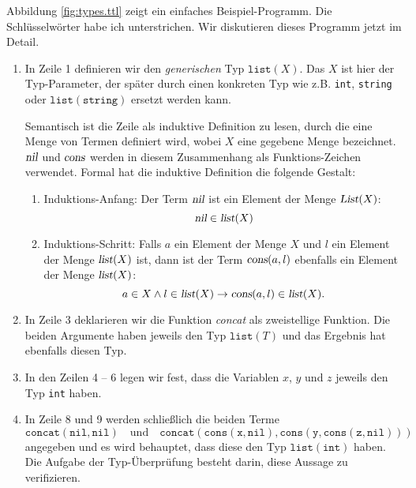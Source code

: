 Abbildung \ref{fig:types.ttl} zeigt ein einfaches Beispiel-Programm.  Die Schl\"usselw\"orter habe ich
unterstrichen.  Wir diskutieren dieses Programm jetzt im Detail.
\begin{enumerate}
\item In Zeile 1 definieren wir den \emph{generischen} Typ $\texttt{list}(X)$.  Das $X$ ist hier der
      Typ-Parameter, der sp\"ater durch einen konkreten Typ wie z.B. \texttt{int},
      \texttt{string} oder $\mathtt{list}(\mathtt{string})$ ersetzt werden kann.

      Semantisch ist die Zeile als induktive Definition zu lesen, durch die eine Menge von Termen
      definiert wird, wobei $X$ eine gegebene Menge bezeichnet. 
      $\textsl{nil}$ und $\textsl{cons}$ werden in diesem Zusammenhang als Funktions-Zeichen verwendet.
      Formal hat die induktive Definition die folgende Gestalt:
      \begin{enumerate}
      \item Induktions-Anfang:  Der Term $\textsl{nil}$ ist ein Element der Menge $\textsl{List}(X)$:
            \[ \textsl{nil} \in \textsl{list}(X) \]
      \item Induktions-Schritt:  Falls $a$ ein Element der Menge $X$ und $l$ ein Element der
            Menge $\textsl{list}(X)$ ist, dann ist der Term $\textsl{cons}(a,l)$ ebenfalls
            ein Element der Menge $\textsl{list}(X)$:
            \[ a \in X \wedge l \in \textsl{list}(X) \rightarrow \textsl{cons}(a,l) \in \textsl{list}(X). \]
      \end{enumerate}
\item In Zeile 3 deklarieren wir die Funktion \textsl{concat} als zweistellige Funktion.  Die
      beiden Argumente haben jeweils den Typ $\texttt{list}(T)$ und das Ergebnis hat ebenfalls
      diesen Typ.
\item In den Zeilen 4 -- 6 legen wir fest, dass die Variablen $x$, $y$ und $z$ jeweils den Typ
      \texttt{int} haben.
\item In Zeile 8 und 9 werden schlie{\ss}lich die beiden Terme
      \[ \mathtt{concat(nil, nil)} \quad \mbox{und} \quad
         \mathtt{concat(cons(x, nil), cons(y, cons(z, nil)))}
      \] 
      angegeben und es wird behauptet, dass diese den Typ $\texttt{list}(\texttt{int})$ haben.
      Die Aufgabe der Typ-\"Uberpr\"ufung besteht darin, diese Aussage zu verifizieren.
\end{enumerate}


